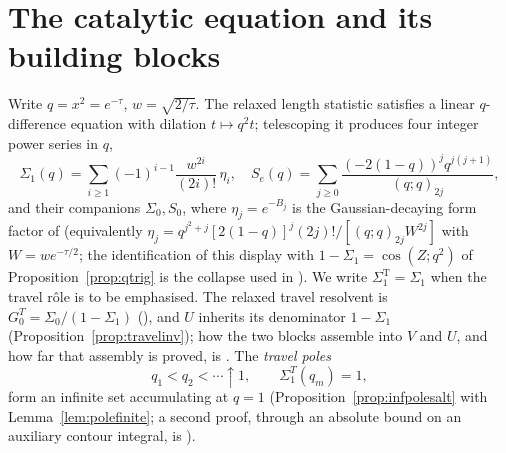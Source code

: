 \documentclass[11pt]{article}
\theoremstyle{plain}
\theoremstyle{definition}
\theoremstyle{remark}
\theoremstyle{plain}\newtheorem*{maintheorem}{Main Theorem}
\begin{document}
\section{The catalytic equation and its building blocks}\label{sec:setup}

Write $q=x^2=e^{-\tau}$, $w=\sqrt{2/\tau}$. The relaxed length statistic satisfies a linear
$q$-difference equation with dilation $t\mapsto q^2t$; telescoping it produces four integer power
series in $q$,
\begin{equation}\label{eq:blocks}
  \Sigma_1(q)=\sum_{i\ge1}(-1)^{i-1}\frac{w^{2i}}{(2i)!}\,\eta_i,\quad
  S_e(q)=\sum_{j\ge0}\frac{(-2(1-q))^j q^{j(j+1)}}{(q;q)_{2j}},
\end{equation}
and their companions $\Sigma_0,S_0$, where $\eta_j=e^{-B_j}$ is the Gaussian-decaying form factor
of {\cite[\S\,\textup{sec:sd}]{Bonfioli2026bB}} (equivalently $\eta_j=q^{j^2+j}[2(1-q)]^j(2j)!/[(q;q)_{2j}W^{2j}]$ with $W=we^{-\tau/2}$; the
identification of this display with $1-\Sigma_1=\cos(Z;q^2)$ of Proposition~\ref{prop:qtrig} is the
collapse used in {\cite[Lemma ``infinitude and accumulation of the travel poles'', \textup{lem:infpoles}]{Bonfioli2026bB}}). We write $\Sigma_1^{\mathrm T}=\Sigma_1$ when the travel
r\^ole is to be emphasised. The relaxed travel resolvent is $G^T_0=\Sigma_0/(1-\Sigma_1)$
({\cite[Proposition ``the travel $k$-sum telescopes'', \textup{prop:travelsum}]{Bonfioli2026bB}}), and $U$ inherits its denominator $1-\Sigma_1$
(Proposition~\ref{prop:travelinv}); how the two blocks assemble into $V$ and $U$, and how far that
assembly is proved, is {\cite[\S\,\textup{sec:assembly}]{Bonfioli2026bB}}. The \emph{travel poles}
\[
   q_1<q_2<\cdots\uparrow1,\qquad \Sigma_1^T(q_m)=1,
\]
form an infinite set accumulating at $q=1$ (Proposition~\ref{prop:infpolesalt} with
Lemma~\ref{lem:polefinite}; a second proof, through an absolute bound on an auxiliary contour
integral, is {\cite[Lemma ``infinitude and accumulation of the travel poles'', \textup{lem:infpoles}]{Bonfioli2026bB}}).
\end{document}
